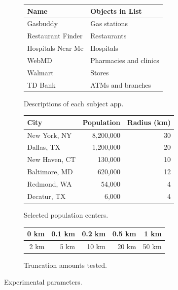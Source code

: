 \documentclass[10pt, conference, compsocconf]{IEEEtran}
\newcommand{\app}[1]{#1}
\newcommand{\hospitals}{\app{Hospitals Near Me}}
\newcommand{\tdbank}{\app{TD Bank}}
\newcommand{\webmd}{\app{WebMD}}
\newcommand{\gasbuddy}{\app{Gasbuddy}}
\newcommand{\restaurantfinder}{\app{Restaurant Finder}}
\newcommand{\walmart}{\app{Walmart}}
\begin{document}
\begin{figure}
  \small
  \begin{subfigure}{\columnwidth}
    \centering
    \begin{tabular}{|l|l|}
      \hline
      Name & Objects in List \\ \hline \hline
      \gasbuddy & Gas stations \\
      \restaurantfinder & Restaurants \\
      \hospitals & Hospitals \\
      \webmd & Pharmacies and clinics \\
      \walmart & Stores \\
      \tdbank & ATMs and branches \\
      \hline
    \end{tabular}
    \caption{Descriptions of each subject app.}
    \label{fig:app-descriptions}
  \end{subfigure}

  \bigskip{}

  \begin{subfigure}{\columnwidth}
      \centering
      \begin{tabular}{|l|r|r|}
        \hline
        City & Population & Radius (km) \\ \hline \hline
        New York, NY & 8,200,000 & 30 \\ \hline
        Dallas, TX & 1,200,000 & 20 \\ \hline
        New Haven, CT & 130,000 & 10 \\ \hline
        Baltimore, MD & 620,000 & 12 \\ \hline
        Redmond, WA & 54,000 & 4 \\ \hline
        Decatur, TX & 6,000 & 4 \\ \hline
      \end{tabular}
      \caption{Selected population centers.}
      \label{fig:regions}
    \end{subfigure}

    \bigskip{}

    \begin{subfigure}{\columnwidth}
      \centering
      \begin{tabular}{|r|r|r|r|r|} \hline
        0 km & 0.1 km & 0.2 km & 0.5 km & 1 km \\ \hline
         2 km & 5 km & 10 km & 20 km & 50 km \\ \hline
      \end{tabular}
      \caption{Truncation amounts tested.}
      \label{fig:truncations}
    \end{subfigure}

  \caption{Experimental parameters.}
\end{figure}
 
\end{document}
